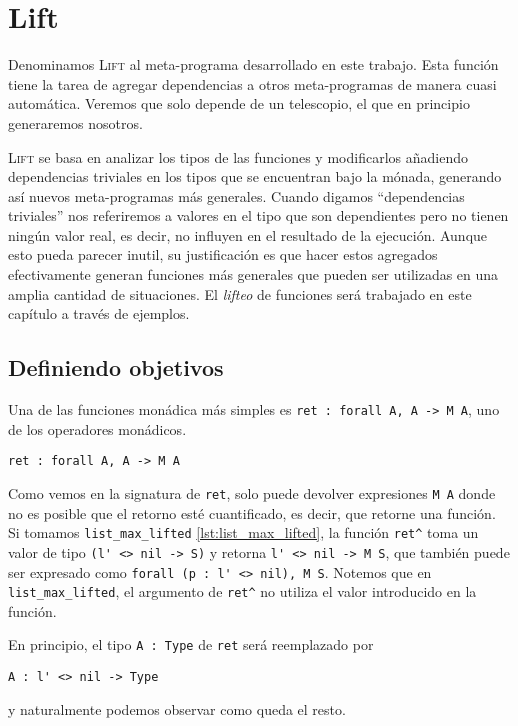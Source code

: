 \chapter{Lift}\label{ch:lift}

Denominamos \textsc{Lift} al meta-programa desarrollado en este trabajo.
Esta función tiene la tarea de agregar dependencias a otros meta-programas de manera cuasi automática. Veremos que solo depende de un telescopio, el que en principio generaremos nosotros.

\textsc{Lift} se basa en analizar los tipos de las funciones y modificarlos añadiendo dependencias triviales en los tipos que se encuentran bajo la mónada, generando así nuevos meta-programas más generales.
Cuando digamos ``dependencias triviales'' nos referiremos a valores en el tipo que son dependientes pero no tienen ningún valor real, es decir, no influyen en el resultado de la ejecución.
Aunque esto pueda parecer inutil, su justificación es que hacer estos agregados efectivamente generan funciones más generales que pueden ser utilizadas en una amplia cantidad de situaciones. 
El \emph{lifteo} de funciones será trabajado en este capítulo a través de ejemplos.

\section{Definiendo objetivos}

Una de las funciones monádica más simples es \lstinline{ret : forall A, A -> M A}, uno de los operadores monádicos.

\begin{lstlisting}[float=h,frame=tb,caption={Signatura de ret},label=lst:ret]
ret : forall A, A -> M A
\end{lstlisting}

Como vemos en la signatura de \lstinline{ret}, solo puede devolver expresiones \lstinline{M A} donde no es posible que el retorno esté cuantificado, es decir, que retorne una función.
Si tomamos \lstinline{list_max_lifted} \ref{lst:list_max_lifted}, la función \lstinline{ret^} toma un valor de tipo \lstinline{(l' <> nil -> S)} y retorna \lstinline{l' <> nil -> M S}, que también puede ser expresado como \lstinline{forall (p : l' <> nil), M S}.
Notemos que en \lstinline{list_max_lifted}, el argumento de \lstinline{ret^} no utiliza el valor introducido en la función.

En principio, el tipo \lstinline{A : Type} de \lstinline{ret} será reemplazado por
\begin{lstlisting}
A : l' <> nil -> Type
\end{lstlisting}
y naturalmente podemos observar como queda el resto. 

